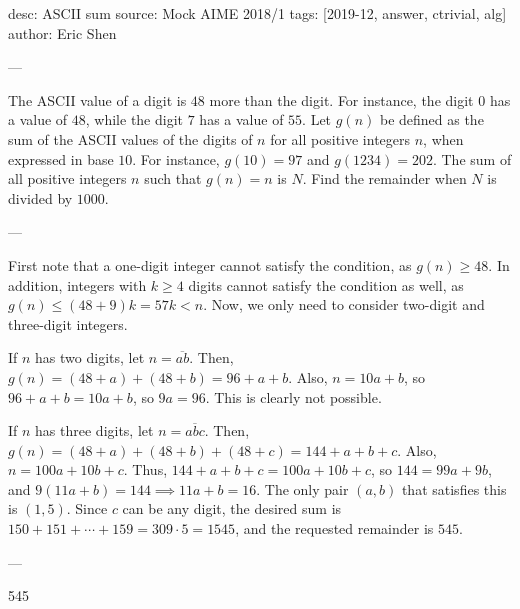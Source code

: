 desc: ASCII sum
source: Mock AIME 2018/1
tags: [2019-12, answer, ctrivial, alg]
author: Eric Shen

---

The ASCII value of a digit is $48$ more than the digit. For instance, the digit $0$ has a value of $48$, while the digit $7$ has a value of $55$. Let $g(n)$ be defined as the sum of the ASCII values of the digits of $n$ for all positive integers $n$, when expressed in base $10$. For instance, $g(10)=97$ and $g(1234)=202$. The sum of all positive integers $n$ such that $g(n)=n$ is $N$. Find the remainder when $N$ is divided by $1000$.

---

First note that a one-digit integer cannot satisfy the condition, as $g(n)\ge 48$. In addition, integers with $k\ge 4$ digits cannot satisfy the condition as well, as $g(n)\le (48+9)k=57k<n$. Now, we only need to consider two-digit and three-digit integers.

If $n$ has two digits, let $n=\overline{ab}$. Then, $g(n)=(48+a)+(48+b)=96+a+b$. Also, $n=10a+b$, so $96+a+b=10a+b$, so $9a=96$. This is clearly not possible.

If $n$ has three digits, let $n=\overline{abc}$. Then, $g(n)=(48+a)+(48+b)+(48+c)=144+a+b+c$. Also, $n=100a+10b+c$. Thus, $144+a+b+c=100a+10b+c$, so $144=99a+9b$, and $9(11a+b)=144\implies 11a+b=16$. The only pair $(a, b)$ that satisfies this is $(1, 5)$. Since $c$ can be any digit, the desired sum is $150+151+\cdots+159=309\cdot 5=1545$, and the requested remainder is $545$.

---

545
